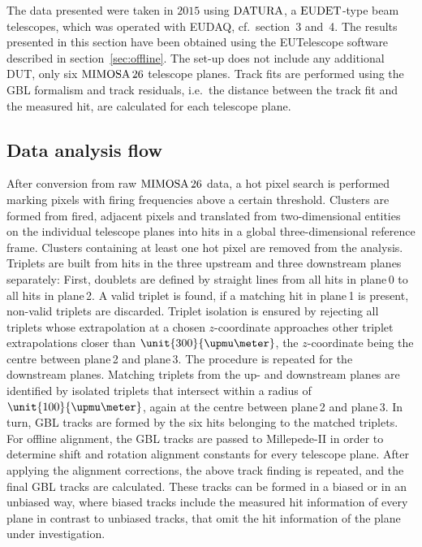 
The data presented were taken in $2015$ using $\textrm{DATURA}$, a $\textrm{EUDET}$-type beam telescopes, which was operated with EUDAQ, cf.~section~3 and~4. 
The results presented in this section have been obtained using the EUTelescope software described in section~\ref{sec:offline}.
The set-up does not include any additional DUT, only six $\textrm{MIMOSA\,26}$ telescope planes. 
Track fits are performed using the GBL formalism and track residuals, i.e.\ the distance between the track fit and the measured hit,
 are calculated for each telescope plane. 
 

\subsection{Data analysis flow}
\label{sec:datura-nodut}

After conversion from raw $\textrm{MIMOSA\,26}$ data, a hot pixel search is performed marking pixels with firing frequencies above a certain threshold.
Clusters are formed from fired, adjacent pixels and translated from two-dimensional entities on the individual telescope planes into hits in a global three-dimensional reference frame.
Clusters containing at least one hot pixel are removed from the analysis. 
Triplets are built from hits in the three upstream and three downstream planes separately: 
First, doublets are defined by straight lines from all hits in plane\,0 to all hits in plane\,2. 
A valid triplet is found, if a matching hit in plane\,1 is present, non-valid triplets are discarded.  
Triplet isolation is ensured by rejecting all triplets whose extrapolation at a chosen $z$-coordinate approaches other triplet extrapolations closer than $\unit{300}{\upmu\meter}$,
 the $z$-coordinate being the centre between plane\,2 and plane\,3. 
The procedure is repeated for the downstream planes. 
Matching triplets from the up- and downstream planes are identified by isolated triplets that intersect within a radius of $\unit{100}{\upmu\meter}$, again at the centre between plane\,2 and plane\,3. 
In turn, GBL tracks are formed by the six hits belonging to the matched triplets. 
For offline alignment, the GBL tracks are passed to Millepede-II in order to determine shift and rotation alignment constants for every telescope plane.
After applying the alignment corrections, the above track finding is repeated, and the final GBL tracks are calculated. 
These tracks can be formed in a \textrm{biased} or in an \textrm{unbiased} way, where biased tracks include the measured hit information of every plane in contrast to unbiased tracks,
 that omit the hit information of the plane under investigation. 

